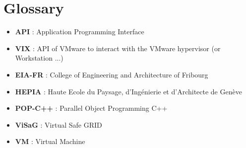 \section{Glossary}

\begin{itemize}
\item \textbf{API} : Application Programming Interface
\item \textbf{VIX} : API of VMware to interact with the VMware hypervisor (or Workstation ...)
\item \textbf{EIA-FR} : College of Engineering and Architecture of Fribourg
\item \textbf{HEPIA} : Haute Ecole du Paysage, d'Ingénierie et d'Architecte de Genève
\item \textbf{POP-C++ }: Parallel Object Programming C++
\item \textbf{ViSaG} : Virtual Safe GRID
\item \textbf{VM} : Virtual Machine
\end{itemize}